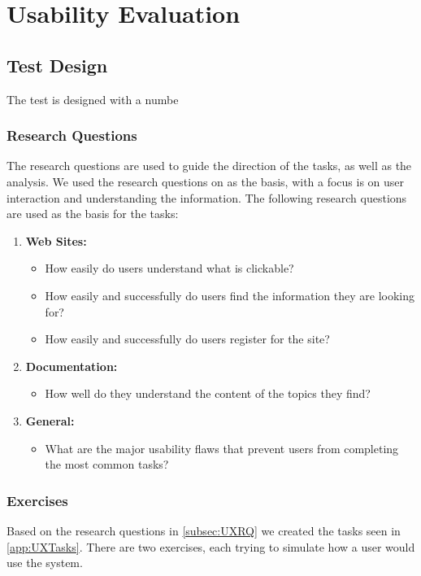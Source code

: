 \chapter{Usability Evaluation}\label{cha:usability}


\section{Test Design}\label{sec:UXTD}
The test is designed with a numbe 



\subsection{Research Questions}\label{subsec:UXRQ}
The research questions are used to guide the direction of the tasks, as well as
the analysis. We used the research questions on \citep[p. 70-71]{UXBook} as the
basis, with a focus is on user interaction and understanding the information.
The following research questions are used as the basis for the tasks:

\begin{enumerate}
  \item \textbf{Web Sites:} 
	\begin{itemize}
      \item How easily do users understand what is clickable?
      \item How easily and successfully do users find the information they are
      looking for?
      \item How easily and successfully do users register for the site?
    \end{itemize}
  \item \textbf{Documentation:}
    \begin{itemize}
      \item How well do they understand the content of the topics they find?
    \end{itemize}
  \item \textbf{General:}
    \begin{itemize}
      \item What are the major usability flaws that prevent users from
      completing the most common tasks?
    \end{itemize}
\end{enumerate}

\subsection{Exercises}
Based on the research questions in \autoref{subsec:UXRQ} we created the tasks
seen in \autoref{app:UXTasks}. There are two exercises, each trying to simulate
how a user would use the system.\nl


